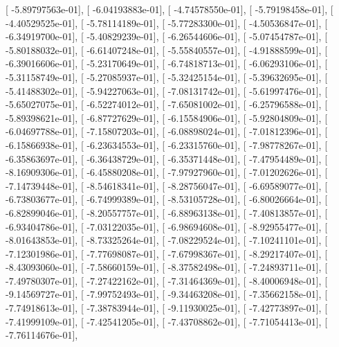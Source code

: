 \documentclass{article}
\begin{document}
       [ -5.89797563e-01],
       [ -6.04193883e-01],
       [ -4.74578550e-01],
       [ -5.79198458e-01],
       [ -4.40529525e-01],
       [ -5.78114189e-01],
       [ -5.77283300e-01],
       [ -4.50536847e-01],
       [ -6.34919700e-01],
       [ -5.40829239e-01],
       [ -6.26544606e-01],
       [ -5.07454787e-01],
       [ -5.80188032e-01],
       [ -6.61407248e-01],
       [ -5.55840557e-01],
       [ -4.91888599e-01],
       [ -6.39016606e-01],
       [ -5.23170649e-01],
       [ -6.74818713e-01],
       [ -6.06293106e-01],
       [ -5.31158749e-01],
       [ -5.27085937e-01],
       [ -5.32425154e-01],
       [ -5.39632695e-01],
       [ -5.41488302e-01],
       [ -5.94227063e-01],
       [ -7.08131742e-01],
       [ -5.61997476e-01],
       [ -5.65027075e-01],
       [ -6.52274012e-01],
       [ -7.65081002e-01],
       [ -6.25796588e-01],
       [ -5.89398621e-01],
       [ -6.87727629e-01],
       [ -6.15584906e-01],
       [ -5.92804809e-01],
       [ -6.04697788e-01],
       [ -7.15807203e-01],
       [ -6.08898024e-01],
       [ -7.01812396e-01],
       [ -6.15866938e-01],
       [ -6.23634553e-01],
       [ -6.23315760e-01],
       [ -7.98778267e-01],
       [ -6.35863697e-01],
       [ -6.36438729e-01],
       [ -6.35371448e-01],
       [ -7.47954489e-01],
       [ -8.16909306e-01],
       [ -6.45880208e-01],
       [ -7.97927960e-01],
       [ -7.01202626e-01],
       [ -7.14739448e-01],
       [ -8.54618341e-01],
       [ -8.28756047e-01],
       [ -6.69589077e-01],
       [ -6.73803677e-01],
       [ -6.74999389e-01],
       [ -8.53105728e-01],
       [ -6.80026664e-01],
       [ -6.82899046e-01],
       [ -8.20557757e-01],
       [ -6.88963138e-01],
       [ -7.40813857e-01],
       [ -6.93404786e-01],
       [ -7.03122035e-01],
       [ -6.98694608e-01],
       [ -8.92955477e-01],
       [ -8.01643853e-01],
       [ -8.73325264e-01],
       [ -7.08229524e-01],
       [ -7.10241101e-01],
       [ -7.12301986e-01],
       [ -7.77698087e-01],
       [ -7.67998367e-01],
       [ -8.29217407e-01],
       [ -8.43093060e-01],
       [ -7.58660159e-01],
       [ -8.37582498e-01],
       [ -7.24893711e-01],
       [ -7.49780307e-01],
       [ -7.27422162e-01],
       [ -7.31464369e-01],
       [ -8.40006948e-01],
       [ -9.14569727e-01],
       [ -7.99752493e-01],
       [ -9.34463208e-01],
       [ -7.35662158e-01],
       [ -7.74918613e-01],
       [ -7.38783944e-01],
       [ -9.11930025e-01],
       [ -7.42773897e-01],
       [ -7.41999109e-01],
       [ -7.42541205e-01],
       [ -7.43708862e-01],
       [ -7.71054413e-01],
       [ -7.76114676e-01],
\end{document}
